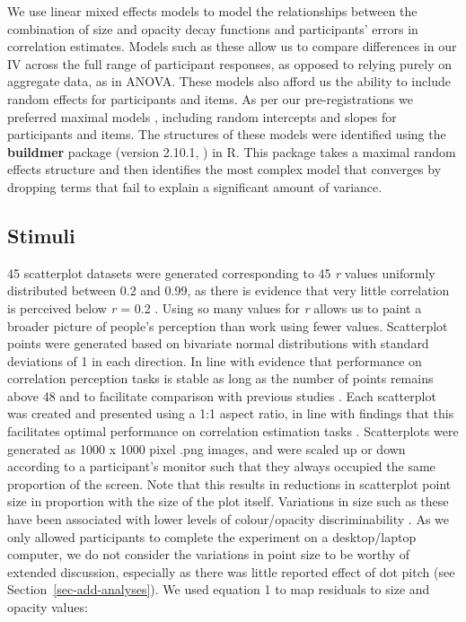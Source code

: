 \documentclass[manuscript, review, anonymous, screen]{acmart}
\begin{document}
We use linear mixed effects models to model the relationships between
the combination of size and opacity decay functions and participants'
errors in correlation estimates. Models such as these allow us to
compare differences in our IV across the full range of participant
responses, as opposed to relying purely on aggregate data, as in ANOVA.
These models also afford us the ability to include random effects for
participants and items. As per our pre-registrations we preferred
maximal models \citep{barr_2013}, including random intercepts and slopes
for participants and items. The structures of these models were
identified using the \textbf{buildmer} package (version 2.10.1,
\citep{voeten_buildmer}) in R. This package takes a maximal random
effects structure and then identifies the most complex model that
converges by dropping terms that fail to explain a significant amount of
variance.

\hypertarget{sec-scatter-gen}{%
\subsection{Stimuli}\label{sec-scatter-gen}}

45 scatterplot datasets were generated corresponding to 45 \emph{r}
values uniformly distributed between 0.2 and 0.99, as there is evidence
that very little correlation is perceived below \emph{r} = 0.2
\citep{strahan_1978, bobko_1979, cleveland_1982}. Using so many values
for \emph{r} allows us to paint a broader picture of people's perception
than work using fewer values. Scatterplot points were generated based on
bivariate normal distributions with standard deviations of 1 in each
direction. In line with evidence that performance on correlation
perception tasks is stable as long as the number of points remains above
48 \citep{rensink_2014} and to facilitate comparison with previous
studies \citep{strain_2023, strain_2023b}. Each scatterplot was created
and presented using a 1:1 aspect ratio, in line with findings that this
facilitates optimal performance on correlation estimation tasks
\citep{micallef_2017}. Scatterplots were generated as 1000 x 1000 pixel
.png images, and were scaled up or down according to a participant's
monitor such that they always occupied the same proportion of the
screen. Note that this results in reductions in scatterplot point size
in proportion with the size of the plot itself. Variations in size such
as these have been associated with lower levels of colour/opacity
discriminability \citep{szafir_2018, smart_2019}. As we only allowed
participants to complete the experiment on a desktop/laptop computer, we
do not consider the variations in point size to be worthy of extended
discussion, especially as there was little reported effect of dot pitch
(see Section~\ref{sec-add-analyses}). We used equation 1 to map
residuals to size and opacity values:
\end{document}
